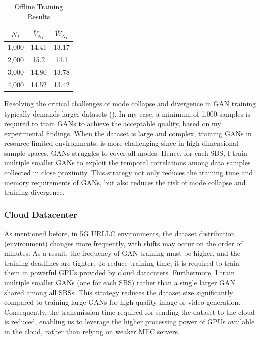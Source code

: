 \documentclass[letterpaper%
, twoside%
, 12pt%
,memoire%
, english%
,creativecommons,hyperref, withAlgo2e %
]{thETS}
\numberwithin{algorithm}{chapter}
\begin{document}
\begin{table}[h]
\centering
\caption{Offline Training Results}
\label{tab:offline_training}
\begin{tabular}{|c|c|c|}
\hline
\textbf{$N_{\Upsilon}$} & \textbf{$\bar{V}_{N_{\Upsilon}}$} & \textbf{$\bar{W}_{N_{\Upsilon}}$} \\ \hline
1,000 & 14.41 & 13.17 \\ \hline
2,000 & 15.2 & 14.1 \\ \hline
3,000 & 14.80 & 13.78 \\ \hline
4,000 & 14.52 & 13.42 \\ \hline
\end{tabular}
\end{table}



Resolving the critical challenges of mode collapse and divergence in GAN training typically demands larger datasets (\cite{bang2021mggan}). In my  case, a minimum of 1,000 samples is required to train GANs to achieve the acceptable quality, based on my  experimental findings. When the dataset is large and complex, training GANs in resource limited environments, is more challenging since in high dimensional sample spaces, GANs struggles to cover all modes. Hence, for each SBS, I train multiple smaller GANs to exploit the temporal correlations among data samples collected in close proximity. This strategy not only reduces the training time and memory requirements of GANs, but also reduces the risk of mode collapse and training divergence.



\subsubsection{Cloud Datacenter}

 As mentioned before, in 5G URLLC environments, the dataset distribution (environment) changes more frequently, with shifts may occur on the order of minutes. As a result, the frequency of GAN training must be higher, and the training deadlines are tighter. To reduce training time, it is required to train them in powerful GPUs provided by cloud datacnters. Furthermore, I train multiple smaller GANs (one for each SBS) rather than a single larger GAN shared among all SBSs. This strategy reduces the dataset size significantly compared to training large GANs for high-quality image or video generation. Consequently, the transmission time required for sending the dataset to the cloud is reduced, enabling us to leverage the higher processing power of GPUs available in the cloud, rather than relying on weaker MEC servers. 
 
\end{document}
